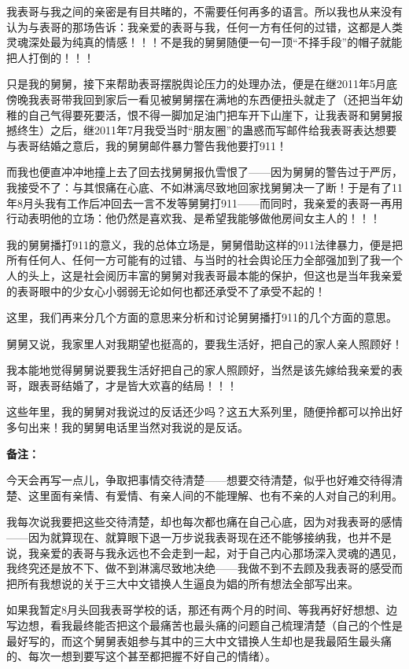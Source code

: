 \documentclass[9pt, b5paper]{article}
\begin{document}
我表哥与我之间的亲密是有目共睹的，不需要任何再多的语言。所以我也从来没有认为与表哥的那场告诉：我亲爱的表哥与我，任何一方有任何的过错，这都是人类灵魂深处最为纯真的情感！！！不是我的舅舅随便一句一顶“不择手段”的帽子就能把人打倒的！！！

只是我的舅舅，接下来帮助表哥摆脱舆论压力的处理办法，便是在继2011年5月底傍晚我表哥带我回到家后一看见被舅舅摆在满地的东西便扭头就走了（还把当年幼稚的自己气得要死要活，恨不得一脚加足油门把车开下山崖下，让我表哥和舅舅报撼终生）之后，继2011年7月我受当时“朋友圈”的蛊惑而写邮件给我表哥表达想要与表哥结婚之意后，我的舅舅邮件暴力警告我他要打911！

而我也便直冲冲地撞上去了回去找舅舅报仇雪恨了——因为舅舅的警告过于严厉，我接受不了：与其恨痛在心底、不如淋漓尽致地回家找舅舅决一了断！于是有了11年8月头我有工作后冲回去一言不发等舅舅打911——而同时，我亲爱的表哥一再用行动表明他的立场：他仍然是喜欢我、是希望我能够做他房间女主人的！！！

我的舅舅播打911的意义，我的总体立场是，舅舅借助这样的911法律暴力，便是把所有任何人、任何一方可能有的过错、与当时的社会舆论压力全部强加到了我一个人的头上，这是社会阅历丰富的舅舅对我表哥最本能的保护，但这也是当年我亲爱的表哥眼中的少女心小弱弱无论如何也都还承受不了承受不起的！

这里，我们再来分几个方面的意思来分析和讨论舅舅播打911的几个方面的意思。 

舅舅又说，我家里人对我期望也挺高的，要我生活好，把自己的家人亲人照顾好！

我本能地觉得舅舅说要我生活好把自己的家人照顾好，当然是该先嫁给我亲爱的表哥，跟表哥结婚了，才是皆大欢喜的结局！！！

这些年里，我的舅舅对我说过的反话还少吗？这五大系列里，随便拎都可以拎出好多句出来！我的舅舅电话里当然对我说的是反话。 

\textbf{备注：}

今天会再写一点儿，争取把事情交待清楚——想要交待清楚，似乎也好难交待得清楚、这里面有亲情、有爱情、有亲人间的不能理解、也有不亲的人对自己的利用。

我每次说我要把这些交待清楚，却也每次都也痛在自己心底，因为对我表哥的感情——因为就算现在、就算眼下退一万步说我表哥现在还不能够接纳我，也并不是说，我亲爱的表哥与我永远也不会走到一起，对于自己内心那场深入灵魂的遇见，我终究还是放不下、做不到淋漓尽致地决绝——我做不到不去顾及我表哥的感受而把所有我想说的关于三大中文错换人生逼良为娼的所有想法全部写出来。

如果我暂定8月头回我表哥学校的话，那还有两个月的时间、等我再好好想想、边写边想，看我最终能否把这个最痛苦也最头痛的问题自己梳理清楚（自己的个性是最好写的，而这个舅舅表姐参与其中的三大中文错换人生却也是我最陌生最头痛的、每次一想到要写这个甚至都把握不好自己的情绪）。
\end{document}
